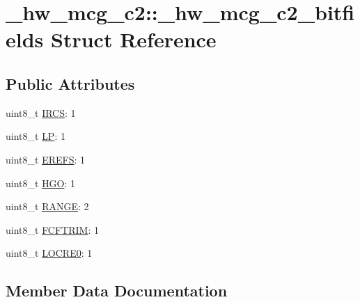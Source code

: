 \hypertarget{struct__hw__mcg__c2_1_1__hw__mcg__c2__bitfields}{}\section{\+\_\+hw\+\_\+mcg\+\_\+c2\+:\+:\+\_\+hw\+\_\+mcg\+\_\+c2\+\_\+bitfields Struct Reference}
\label{struct__hw__mcg__c2_1_1__hw__mcg__c2__bitfields}
\subsection*{Public Attributes}
\begin{DoxyCompactItemize}
\item 
uint8\+\_\+t \hyperlink{struct__hw__mcg__c2_1_1__hw__mcg__c2__bitfields_a1ba4b2ee8692643f467bb2e139abe8f9}{I\+R\+CS}\+: 1
\item 
uint8\+\_\+t \hyperlink{struct__hw__mcg__c2_1_1__hw__mcg__c2__bitfields_ad6c76cf33b3b9f22a0b6e9642a3f80d5}{LP}\+: 1
\item 
uint8\+\_\+t \hyperlink{struct__hw__mcg__c2_1_1__hw__mcg__c2__bitfields_a408231fd19e829bc7c02dda302857584}{E\+R\+E\+FS}\+: 1
\item 
uint8\+\_\+t \hyperlink{struct__hw__mcg__c2_1_1__hw__mcg__c2__bitfields_ac283a0dfacf7c5e2700efb51e443ee6e}{H\+GO}\+: 1
\item 
uint8\+\_\+t \hyperlink{struct__hw__mcg__c2_1_1__hw__mcg__c2__bitfields_aedddb4ddd2f8944f3d94e4efb99b8783}{R\+A\+N\+GE}\+: 2
\item 
uint8\+\_\+t \hyperlink{struct__hw__mcg__c2_1_1__hw__mcg__c2__bitfields_a9991bca9018033f9b17d6000b78000fa}{F\+C\+F\+T\+R\+IM}\+: 1
\item 
uint8\+\_\+t \hyperlink{struct__hw__mcg__c2_1_1__hw__mcg__c2__bitfields_aa8de466d05d38f2fbd4465a236948a39}{L\+O\+C\+R\+E0}\+: 1
\end{DoxyCompactItemize}


\subsection{Member Data Documentation}
